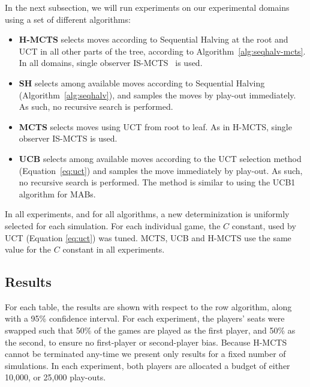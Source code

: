 \documentclass[a4paper]{llncs}
\begin{document}
In the next subsection, we will run experiments on our experimental domains using a set of different algorithms:
\begin{itemize}
\item \textbf{H-MCTS} selects moves according to Sequential Halving at the root and UCT in all other parts of the tree, according to Algorithm~\ref{alg:seqhalv-mcts}. In all domains, single observer IS-MCTS~\cite{cowling2012} is used.
\item \textbf{SH} selects among available moves according to Sequential Halving (Algorithm~\ref{alg:seqhalv}), and samples the moves by play-out immediately. As such, no recursive search is performed.
\item \textbf{MCTS} selects moves using UCT from root to leaf. As in {\sc H-MCTS}, single observer IS-MCTS is used.
\item \textbf{UCB} selects among available moves according to the UCT selection method (Equation~\ref{eq:uct}) and samples the move immediately by play-out. As such, no recursive search is performed. The method is similar to using the UCB1 algorithm for MABs.
\end{itemize}
In all experiments, and for all algorithms, a new determinization is uniformly selected for each simulation. For each individual game, the $C$ constant, used by UCT (Equation \ref{eq:uct}) was tuned. MCTS, UCB and H-MCTS use the same value for the $C$ constant in all experiments.

\subsection{Results}
\label{subsec:results}

For each table, the results are shown with respect to the row algorithm, along with a 95\% confidence interval. For each experiment, the players' seats were swapped such that 50\% of the games are played as the first player, and 50\% as the second, to ensure no first-player or second-player bias. Because H-MCTS cannot be terminated any-time we present only results for a fixed number of simulations. In each experiment, both players are allocated a budget of either 10,000, or 25,000 play-outs.
\end{document}
